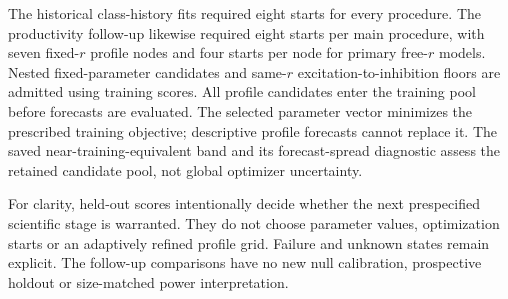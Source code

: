 The historical class-history fits required eight starts for every
procedure. The productivity follow-up likewise required eight starts per
main procedure, with seven fixed-\(r\) profile nodes and four starts per
node for primary free-\(r\) models. Nested fixed-parameter candidates and
same-\(r\) excitation-to-inhibition floors are admitted using training
scores. All profile candidates enter the training pool before forecasts
are evaluated. The selected parameter vector minimizes the prescribed
training objective; descriptive profile forecasts cannot replace it.
The saved near-training-equivalent band and its forecast-spread diagnostic
assess the retained candidate pool, not global optimizer uncertainty.

For clarity, held-out scores intentionally decide whether the next
prespecified scientific stage is warranted. They do not choose parameter
values, optimization starts or an adaptively refined profile grid.
Failure and unknown states remain explicit. The follow-up comparisons
have no new null calibration, prospective holdout or size-matched power
interpretation.
